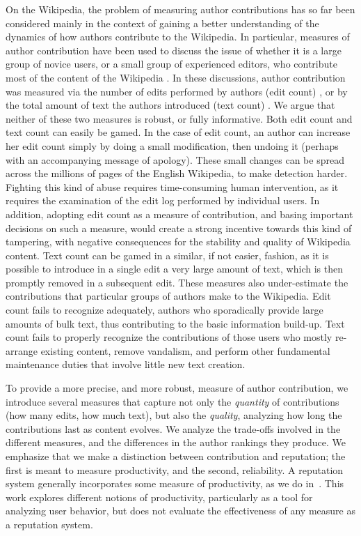 On the Wikipedia, the problem of measuring author contributions has
so far been considered mainly in the context of gaining a better
understanding of the dynamics of how authors contribute to the
Wikipedia. 
In particular, measures of author contribution have been used to
discuss the issue of whether it is a large group of novice users, or a
small group of experienced editors, who contribute most of the
content of the Wikipedia \cite{Wales2005,Swartz2006,Bourgeoisie2007}. 
In these discussions, author contribution was measured via the number
of edits performed by authors (edit count) \cite{Wales2005,EditsEqQuality2007,
Bourgeoisie2007,WikiDashboard2008,OrtegaBarahona2007,SteinHess2007},
or by the total amount of text the authors introduced (text count)
\cite{Swartz2006}. 
We argue that neither of these two measures is robust, or fully
informative. 
Both edit count and text count can easily be gamed. 
In the case of edit count, an author can increase her edit count
simply by doing a small modification, then undoing it (perhaps with an
accompanying message of apology).  
These small changes can be spread across the millions of pages of the
English Wikipedia, to make detection harder. 
Fighting this kind of abuse requires time-consuming human
intervention, as it requires the examination of the edit log performed
by individual users. 
In addition, adopting edit count as a measure of contribution,
and basing important decisions on such a measure, would create a strong
incentive towards this kind of tampering, with negative consequences
for the stability and quality of Wikipedia content. 
Text count can be gamed in a similar, if not easier, fashion, as it is
possible to introduce in a single edit a very large amount of text,
which is then promptly removed in a subsequent edit. 
These measures also under-estimate the contributions that particular
groups of authors make to the Wikipedia. 
Edit count fails to recognize adequately, authors who sporadically provide
large amounts of bulk text, thus contributing to the basic information
build-up.
Text count fails to properly recognize the contributions of those
users who mostly re-arrange existing content, remove vandalism, and
perform other fundamental maintenance duties that involve little new
text creation. 

To provide a more precise, and more robust, measure of author
contribution, we introduce several measures that capture not only the 
{\em quantity\/} of contributions (how many edits, how much text),
but also the {\em quality\/}, analyzing how long the contributions last
as content evolves. 
We analyze the trade-offs involved in the different measures, and the
differences in the author rankings they produce. 
We emphasize that we make a distinction between
contribution and reputation; the first is meant to measure productivity,
and the second, reliability.
A reputation system generally incorporates some measure of productivity,
as we do in~\cite{www07}.
This work explores different notions of productivity,
particularly as a tool for analyzing user behavior,
but does not evaluate the effectiveness of any measure
as a reputation system.

